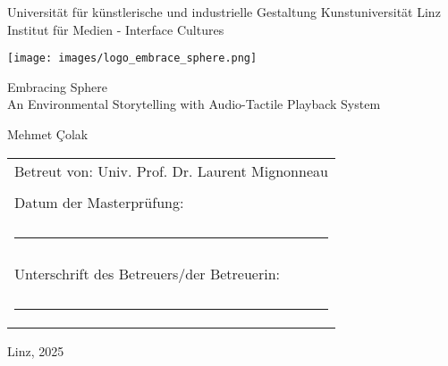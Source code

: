 \begin{titlepage}
    \centering

    {\large
    Universität für künstlerische und industrielle Gestaltung Kunstuniversität Linz\\
    Institut für Medien - Interface Cultures}
        
        \vspace{1cm}

        \texttt{[image: images/logo\_embrace\_sphere.png]}
        
        {\Huge Embracing Sphere\\[0.5cm]
        \Large An Environmental Storytelling with Audio-Tactile Playback System}

        \vspace{0.5cm}

        {\LARGE Mehmet Çolak}

        \vfill

        \begin{tabular}{l}
            \Large Betreut von: Univ. Prof. Dr. Laurent Mignonneau \\ \\
            \large Datum der Masterprüfung: \\ \\
            \rule{7cm}{0.1pt} \\ \\
            \large Unterschrift des Betreuers/der Betreuerin: \\ \\
            \rule{7cm}{0.1pt} \\
        \end{tabular}
        
        \vspace{1cm}
        
        {\small Linz, 2025}

\end{titlepage}